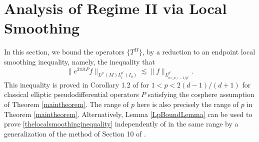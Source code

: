 \begin{comment}






% 


\end{comment}








\section{Analysis of Regime II via Local Smoothing} \label{regime2finalsection}

In this section, we bound the operators $\{ T^{II} \}$, by a reduction to an endpoint local smoothing inequality, namely, the inequality that
%
\begin{equation} \label{thelocalsmoothinginequality}
    \| e^{2\pi i t P} f \|_{L^{p'}(M) L^{p'}_t(I_0)} \lesssim \| f \|_{L^{p'}_{\alpha(p) - 1/p'}}.
\end{equation}
%
This inequality is proved in Corollary 1.2 of \cite{LeeSeeger} for $1 < p < 2(d-1)/(d+1)$ for classical elliptic pseudodifferential operators $P$ satisfying the cosphere assumption of Theorem \ref{maintheorem}. The range of $p$ here is also precisely the range of $p$ in Theorem \ref{maintheorem}. Alternatively, Lemma \ref{LpBoundLemma} can be used to prove \eqref{thelocalsmoothinginequality} independently of \cite{LeeSeeger} in the same range by a generalization of the method of Section 10 of \cite{HeoandNazarovandSeeger}.

